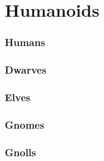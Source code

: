 \documentclass[a4paper,openany]{book}
\begin{document}
\chapter{Humanoids}

\begin{multicols}{2}

\subsection{Humans}

\humanfarmer

\humanmaid

\humansoldier

\humansoldier

\humandiplomat

\humanbard

\humanbard

\humanthief

\humanalchemist

\necromancer

\subsection{Dwarves}

\dwarvensoldier

\dwarventrader

\dwarvenrunemaster

\subsection{Elves}

\elf

\elf

\elvenenchanter

\subsection{Gnomes}

\gnome

\gnomishsoldier

\gnomishsoldier

\gnomishillusionist

\subsection{Gnolls}

\gnollhunter

\gnollshaman

\gnollshaman

\end{multicols}
\end{document}
